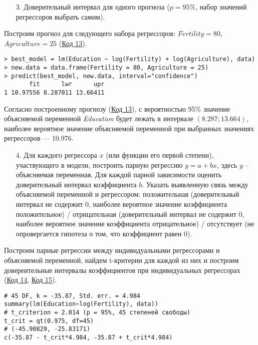 \begin{enumerate}
    \item[3.] Доверительный интервал для одного прогноза ($p = 95\%$, набор значений регрессоров выбрать самим).
\end{enumerate}

Построим прогноз для следующего набора регрессоров: $\textit{Fertility} = 80$, $\textit{Agriculture} = 25$ (\hyperref[code:13]{Код 13}).

\begin{code}
\begin{verbatim}
> best_model = lm(Education ~ log(Fertility) + log(Agriculture), data)
> new.data = data.frame(Fertility = 80, Agriculture = 25)
> predict(best_model, new.data, interval="confidence")
       fit      lwr      upr
1 10.97556 8.287011 13.66411
\end{verbatim}
\label{code:13}
\end{code}

Согласно построенному прогнозу (\hyperref[code:13]{Код 13}), с вероятностью 95\% значение объясняемой переменной \textit{Education} будет лежать в интервале $(8.287; 13.664)$, наиболее вероятное значение объясняемой переменной при выбранных значениях регрессоров --- 10.976.

\begin{enumerate}
    \item[4.] Для каждого регрессора $x$ (или функции его первой степени), участвующего в модели, построить парную регрессию $y = a + bx$, здесь $y$ – объясняемая переменная. Для каждой парной зависимости оценить доверительный интервал коэффициента $b$. Указать выявленную связь между объясняемой переменной и регрессором: положительная (доверительный интервал не содержит 0, наиболее вероятное значение коэффициента положительное) / отрицательная (доверительный интервал не содержит 0, наиболее вероятное значение коэффициента отрицательное) / отсутствует (не опровергается гипотеза о том, что коэффициент равен 0).
\end{enumerate}

Построим парные регрессии между индивидуальными регрессорами и объясняемой переменной, найдем t-критерии для каждой из них и построим довереительные интервалы коэффициентов при индивидуальных регрессорах (\hyperref[code:14]{Код 14}, \hyperref[code:15]{Код 15}).

\begin{code}
\begin{verbatim}
# 45 DF, k = -35.87, Std. err. = 4.984
summary(lm(Education~log(Fertility), data))
# t_criterion = 2.014 (p = 95%, 45 степеней свободы)
t_crit = qt(0.975, df=45)
# (-45.90829, -25.83171)
c(-35.87 - t_crit*4.984, -35.87 + t_crit*4.984)
\end{verbatim}
\label{code:14}
\end{code}

